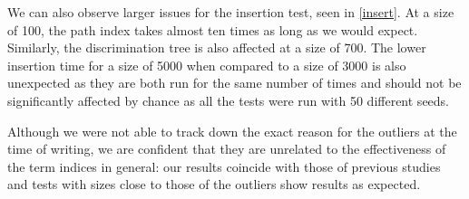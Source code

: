 We can also observe larger issues for the insertion test, seen in \cref{insert}. At a size of 100, the path index takes almost ten times as long as we would expect. Similarly, the discrimination tree is also affected at a size of 700. The lower insertion time for a size of 5000 when compared to a size of 3000 is also unexpected as they are both run for the same number of times and should not be significantly affected by chance as all the tests were run with 50 different seeds.

Although we were not able to track down the exact reason for the outliers at the time of writing, we are confident that they are unrelated to the effectiveness of the term indices in general: our results coincide with those of previous studies \cite{stickel_path-indexing_1989,mccune_experiments_1992,carbonell_comparison_1995} and tests with sizes close to those of the outliers show results as expected.
